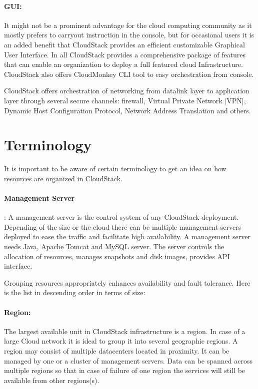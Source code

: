 \paragraph{GUI:} It might not be a prominent advantage for the cloud
computing community as it mostly prefers to carryout instruction in
the console, but for occasional users it is an added benefit that
CloudStack provides an efficient customizable Graphical User
Interface. In all CloudStack provides a comprehensive package of
features that can enable an organization to deploy a full featured
cloud Infrastructure. CloudStack also offers CloudMonkey CLI 
tool to easy orchestration from console.

CloudStack offers orchestration of networking from datalink layer
to application layer through several secure channels:
firewall, Virtual Private Network [VPN], Dynamic Host Configuration 
Protocol, Network Address Translation and others.

\section{Terminology}

It is important to be aware of certain terminology to get an idea on
how resources are organized in CloudStack.
\paragraph{Management Server}:
A management server is the control system of any CloudStack deployment. 
Depending of the size or the cloud there can be multiple management 
servers deployed to ease the traffic and facilitate high availability.
A management server needs Java, Apache Tomcat and MySQL server. The server
controls the allocation of resources, manages snapshots and disk images,
provides API interface.



Grouping resources appropriately enhances availability and fault tolerance. Here is the 
list in descending order in terms of size:
\paragraph{Region:}	The largest available unit in CloudStack infrastructure is a 
region. In case of a large Cloud network it is ideal to group it into 
several geographic regions. A region may consist of multiple datacenters
located in proximity. It can be managed by one or a cluster of management
servers. Data can be spanned across multiple regions so that in case of
failure of one region the services will still be available from other regions(s).
